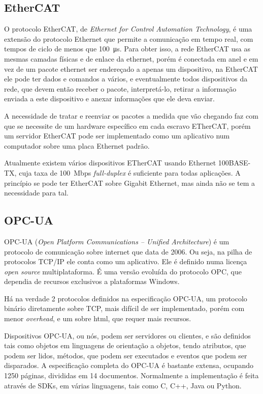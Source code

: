 \subsection{EtherCAT}

O protocolo EtherCAT, de \emph{Ethernet for Control Automation Technology}, é uma extensão do protocolo Ethernet que permite a comunicação em tempo real, com tempos de ciclo de menos que \SI{100}{\micro\second}. Para obter isso, a rede EtherCAT usa as mesmas camadas físicas e de enlace da ethernet, porém é conectada em anel e em vez de um pacote ethernet ser endereçado a apenas um dispositivo, na EtherCAT ele pode ter dados e comandos a vários, e eventualmente todos dispositivos da rede, que devem então receber o pacote, interpretá-lo, retirar a informação enviada a este dispositivo e anexar informações que ele deva enviar.

A necessidade de tratar e reenviar os pacotes a medida que vão chegando faz com que se necessite de um hardware específico em cada escravo ETherCAT, porém um servidor EtherCAT pode ser implementado como um aplicativo num computador sobre uma placa Ethernet padrão.

Atualmente existem vários dispositivos ETherCAT usando Ethernet 100BASE-TX, cuja taxa de \SI{100}{Mbps} \emph{full-duplex} é suficiente para todas aplicações. A princípio se pode ter EtherCAT sobre Gigabit Ethernet, mas ainda não se tem a necessidade para tal.

\subsection{OPC-UA}

OPC-UA (\emph{Open Platform Communications -- Unified Architecture}) é um protocolo de comunicação sobre internet que data de 2006. Ou seja, na pilha de protocolos TCP/IP ele conta como um aplicativo. Ele é definido numa licença \emph{open source} multiplataforma. É uma versão evoluída do protocolo OPC, que dependia de recursos exclusivos a plataformas Windows.

Há na verdade 2 protocolos definidos na especificação OPC-UA, um protocolo binário diretamente sobre TCP, mais difícil de ser implementado, porém com menor \emph{overhead}, e um sobre html, que requer mais recursos.

Dispositivos OPC-UA, ou nós, podem ser servidores ou clientes, e são definidos tais como objetos em linguagens de orientação a objetos, tendo atributos, que podem ser lidos, métodos, que podem ser executados e eventos que podem ser disparados. A especificação completa do OPC-UA é bastante extensa, ocupando 1250 páginas, divididas em 14 documentos. Normalmente a implementação é feita através de SDKs, em várias linguagens, tais como C, C++, Java ou Python.